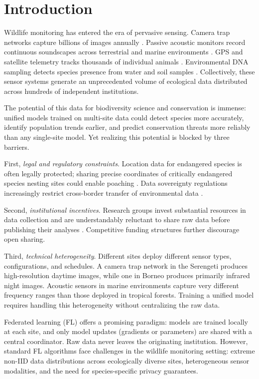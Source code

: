 \section{Introduction}

\label{sec:introduction}

Wildlife monitoring has entered the era of pervasive sensing.
Camera trap networks capture billions of images annually \citep{ahumada2020wildlife}.
Passive acoustic monitors record continuous soundscapes across terrestrial and marine environments \citep{gibb2019emerging}.
GPS and satellite telemetry tracks thousands of individual animals \citep{kays2015terrestrial}.
Environmental DNA sampling detects species presence from water and soil samples \citep{deiner2017environmental}.
Collectively, these sensor systems generate an unprecedented volume of ecological data distributed across hundreds of independent institutions.

The potential of this data for biodiversity science and conservation is immense: unified models trained on multi-site data could detect species more accurately, identify population trends earlier, and predict conservation threats more reliably than any single-site model.
Yet realizing this potential is blocked by three barriers.

First, \emph{legal and regulatory constraints}.
Location data for endangered species is often legally protected; sharing precise coordinates of critically endangered species nesting sites could enable poaching \citep{lindenmayer2017do}.
Data sovereignty regulations increasingly restrict cross-border transfer of environmental data \citep{fritz2019citizen}.

Second, \emph{institutional incentives}.
Research groups invest substantial resources in data collection and are understandably reluctant to share raw data before publishing their analyses \citep{tenopir2011data}.
Competitive funding structures further discourage open sharing.

Third, \emph{technical heterogeneity}.
Different sites deploy different sensor types, configurations, and schedules.
A camera trap network in the Serengeti produces high-resolution daytime images, while one in Borneo produces primarily infrared night images.
Acoustic sensors in marine environments capture very different frequency ranges than those deployed in tropical forests.
Training a unified model requires handling this heterogeneity without centralizing the raw data.

Federated learning (FL) \citep{mcmahan2017communication} offers a promising paradigm: models are trained locally at each site, and only model updates (gradients or parameters) are shared with a central coordinator.
Raw data never leaves the originating institution.
However, standard FL algorithms face challenges in the wildlife monitoring setting: extreme non-IID data distributions across ecologically diverse sites, heterogeneous sensor modalities, and the need for species-specific privacy guarantees.

